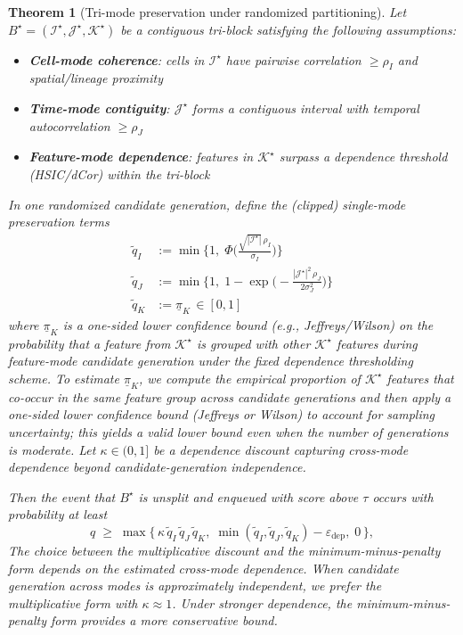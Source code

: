 \documentclass[unnumsec,webpdf,modern,large,namedate]{oup-authoring-template}%
\theoremstyle{thmstyleone}\newtheorem{theorem}{Theorem}
\theoremstyle{thmstyletwo}\newtheorem{example}{Example}
\theoremstyle{thmstylethree}\newtheorem{definition}{Definition}
\begin{document}
\begin{theorem}[Tri-mode preservation under randomized partitioning]
\label{thm:trimode_preservation}
Let $B^\star=(\mathcal I^\star,\mathcal J^\star,\mathcal K^\star)$ be a contiguous tri-block satisfying the following assumptions:
\begin{itemize}
    \item[(A1)] \textbf{Cell-mode coherence}: cells in $\mathcal{I}^\star$ have pairwise correlation $\geq \rho_I$ and spatial/lineage proximity
    \item[(A2)] \textbf{Time-mode contiguity}: $\mathcal{J}^\star$ forms a contiguous interval with temporal autocorrelation $\geq \rho_J$
    \item[(A3)] \textbf{Feature-mode dependence}: features in $\mathcal{K}^\star$ surpass a dependence threshold (HSIC/dCor) within the tri-block
\end{itemize}

In one randomized candidate generation, define the (clipped) single-mode preservation terms
\begin{align}
\tilde q_I &:= \min\!\Big\{1,\; \Phi\!\Big(\tfrac{\sqrt{|\mathcal{I}^\star|} \, \rho_I}{\sigma_I}\Big)\Big\} \\
\tilde q_J &:= \min\!\Big\{1,\; 1 - \exp\!\Big(-\tfrac{|\mathcal{J}^\star|^2 \, \rho_J}{2\sigma_J^2}\Big)\Big\} \\
\tilde q_K &:= \underline{\pi}_K\,\in[0,1]
\end{align}
where $\underline{\pi}_K$ is a one-sided lower confidence bound (e.g., Jeffreys/Wilson) on the probability that a feature from $\mathcal{K}^\star$ is grouped with other $\mathcal{K}^\star$ features during \emph{feature-mode candidate generation} under the fixed dependence thresholding scheme. To estimate $\underline{\pi}_K$, we compute the empirical proportion of $\mathcal{K}^\star$ features that co-occur in the same feature group across candidate generations and then apply a one-sided lower confidence bound (Jeffreys or Wilson) to account for sampling uncertainty; this yields a valid lower bound even when the number of generations is moderate. Let $\kappa\in(0,1]$ be a dependence discount capturing cross-mode dependence beyond candidate-generation independence.

Then the event that $B^\star$ is unsplit and enqueued with score above $\tau$ occurs with probability at least
\begin{equation}
q \;\ge\; \max\Big\{\, \kappa\, \tilde q_I\, \tilde q_J\, \tilde q_K,\; \min(\tilde q_I,\tilde q_J,\tilde q_K) - \varepsilon_{\mathrm{dep}},\; 0\,\Big\},
\label{eq:q_lower}
\end{equation}
The choice between the multiplicative discount and the minimum-minus-penalty form depends on the estimated cross-mode dependence. When candidate generation across modes is approximately independent, we prefer the multiplicative form with $\kappa\approx 1$. Under stronger dependence, the minimum-minus-penalty form provides a more conservative bound.


\end{theorem}
\end{document}
